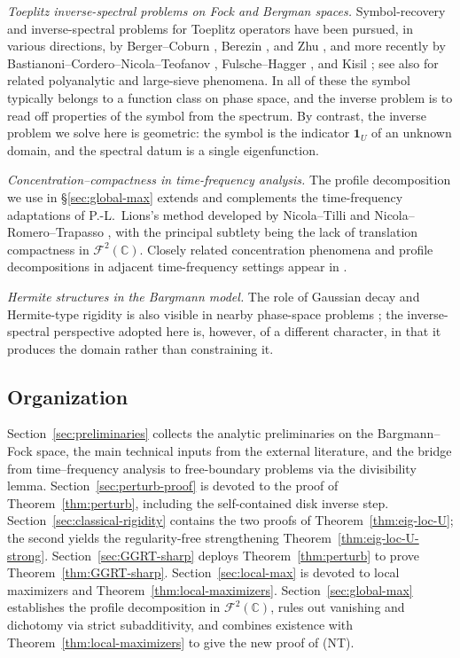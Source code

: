 \documentclass[a4paper,11pt,reqno]{amsart}
\numberwithin{equation}{section}
\theoremstyle{plain} %
\theoremstyle{definition} %
\theoremstyle{remark}
\newcommand{\C}{\mathbb{C}}
\begin{document}
\smallskip
\noindent\emph{Toeplitz inverse-spectral problems on Fock and Bergman spaces.}
Symbol-recovery and inverse-spectral problems for Toeplitz operators have been pursued, in various directions, by Berger--Coburn \cite{Berger-Coburn-Symbol,Berger-Coburn,Berger-Coburn-Heat}, Berezin \cite{Berezin}, and Zhu \cite{Zhu}, and more recently by Bastianoni--Cordero--Nicola--Teofanov \cite{Bastianoni-Cordero-Nicola,Bastianoni-Teofanov}, Fulsche--Hagger \cite{Fulsche-Hagger}, and Kisil \cite{Kisil-CrossToeplitz}; see also \cite{abreu2021donoho} for related polyanalytic and large-sieve phenomena. In all of these the symbol typically belongs to a function class on phase space, and the inverse problem is to read off properties of the symbol from the spectrum. By contrast, the inverse problem we solve here is geometric: the symbol is the indicator $\mathbf 1_U$ of an unknown domain, and the spectral datum is a single eigenfunction.

\smallskip
\noindent\emph{Concentration--compactness in time-frequency analysis.}
The profile decomposition we use in \S\ref{sec:global-max} extends and complements the time-frequency adaptations of P.-L.~Lions's method developed by Nicola--Tilli \cite{Nicola-Tilli,Nicola-Tilli-2} and Nicola--Romero--Trapasso \cite{Nicola-Romero-Trapasso}, with the principal subtlety being the lack of translation compactness in $\mathcal F^2(\C)$. Closely related concentration phenomena and profile decompositions in adjacent time-frequency settings appear in \cite{Marceca-Romero-Speckbacher,Samuelsen,Fulsche-Hagger}.

\smallskip
\noindent\emph{Hermite structures in the Bargmann model.}
The role of Gaussian decay and Hermite-type rigidity is also visible in nearby phase-space problems \cite{Kulikov-Oliveira-Ramos,Goncalves-Oliveira-Steinerberger,Thangavelu}; the inverse-spectral perspective adopted here is, however, of a different character, in that it produces the domain rather than constraining it.

\subsection{Organization}\label{ssec:intro-organization}

Section~\ref{sec:preliminaries} collects the analytic preliminaries on the Bargmann--Fock space, the main technical inputs from the external literature, and the bridge from time--frequency analysis to free-boundary problems via the divisibility lemma. Section~\ref{sec:perturb-proof} is devoted to the proof of Theorem~\ref{thm:perturb}, including the self-contained disk inverse step. Section~\ref{sec:classical-rigidity} contains the two proofs of Theorem~\ref{thm:eig-loc-U}; the second yields the regularity-free strengthening Theorem~\ref{thm:eig-loc-U-strong}. Section~\ref{sec:GGRT-sharp} deploys Theorem~\ref{thm:perturb} to prove Theorem~\ref{thm:GGRT-sharp}. Section~\ref{sec:local-max} is devoted to local maximizers and Theorem~\ref{thm:local-maximizers}. Section~\ref{sec:global-max} establishes the profile decomposition in $\mathcal F^2(\C)$, rules out vanishing and dichotomy via strict subadditivity, and combines existence with Theorem~\ref{thm:local-maximizers} to give the new proof of (NT).
\end{document}
